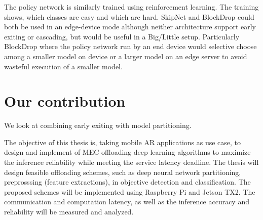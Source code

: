 The policy network is similarly trained using reinforcement learning. The training shows, which classes are easy and which are hard. SkipNet and BlockDrop could both be used in an edge-device mode although neither architecture support early exiting or cascading, but would be useful in a Big/Little \cite{park_big/little_2015} setup. Particularly BlockDrop where the policy network run by an end device would selective choose among a smaller model on device or a larger model on an edge server to avoid wasteful execution of a smaller model.

\section{Our contribution}

We look at combining early exiting with model partitioning. 

The objective of this thesis is, taking mobile AR applications as use case, to design and implement of MEC offloading deep learning algorithms to maximize the inference reliability while meeting the service latency deadline. The thesis will design feasible offloading schemes, such as deep neural network partitioning, preprosssing (feature extractions), in objective detection and classification. The proposed schemes will be implemented using Raspberry Pi and Jetson TX2. The communication and computation latency, as well as the inference accuracy and reliability will be measured and analyzed.